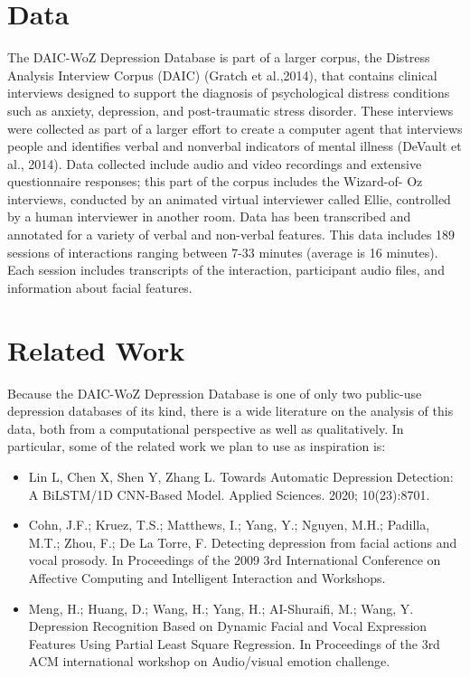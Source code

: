 \section{Data}

The DAIC-WoZ Depression Database is part of a larger corpus, the Distress Analysis Interview Corpus (DAIC) (Gratch et al.,2014), that contains clinical interviews designed to support the diagnosis of psychological distress conditions such as anxiety, depression, and post-traumatic stress disorder. These interviews were collected as part of a larger effort to create a computer agent that interviews people and identifies verbal and nonverbal indicators of mental illness (DeVault et al., 2014). Data collected include audio and video recordings and extensive questionnaire responses; this part of the corpus includes the Wizard-of- Oz interviews, conducted by an animated virtual interviewer called Ellie, controlled by a human interviewer in another room. Data has been transcribed and annotated for a variety of verbal and non-verbal features. This data includes 189 sessions of interactions ranging between 7-33 minutes (average is 16 minutes). Each session includes transcripts of the interaction, participant audio files, and information about facial features.



\section{Related Work}

Because the DAIC-WoZ Depression Database is one of only two public-use depression databases of its kind, there is a wide literature on the analysis of this data, both from a computational perspective as well as qualitatively. In particular, some of the related work we plan to use as inspiration is:

\begin{itemize}
    \item Lin L, Chen X, Shen Y, Zhang L. Towards Automatic Depression Detection: A BiLSTM/1D CNN-Based Model. Applied Sciences. 2020; 10(23):8701. 
    \item Cohn, J.F.; Kruez, T.S.; Matthews, I.; Yang, Y.; Nguyen, M.H.; Padilla, M.T.; Zhou, F.; De La Torre, F. Detecting depression from facial actions and vocal prosody. In Proceedings of the 2009 3rd International Conference on Affective Computing and Intelligent Interaction and Workshops.
    \item Meng, H.; Huang, D.; Wang, H.; Yang, H.; AI-Shuraifi, M.; Wang, Y. Depression Recognition Based on Dynamic Facial and Vocal Expression Features Using Partial Least Square Regression. In Proceedings of the 3rd ACM international workshop on Audio/visual emotion challenge.
\end{itemize}



